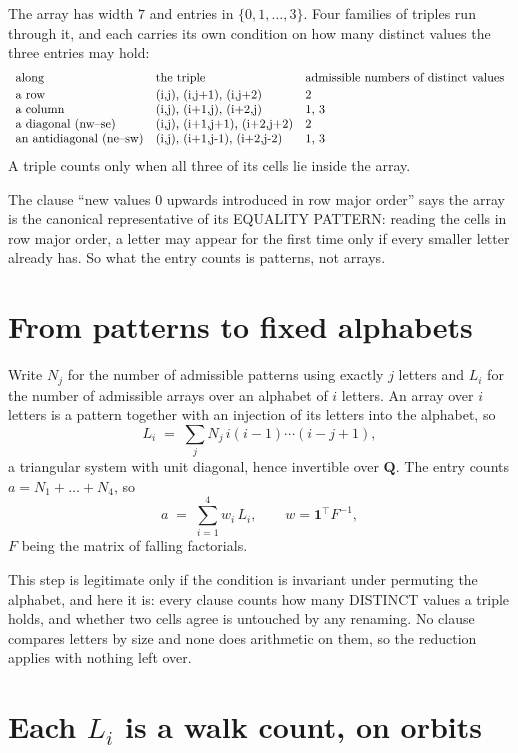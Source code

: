 \documentclass[11pt,a4paper]{article}
\theoremstyle{plain}
\theoremstyle{definition}
\begin{document}
The array has width $7$ and entries in $\{0,1,\dots,3\}$. Four families of triples
run through it, and each carries its own condition on how many distinct values the three
entries may hold:
\[
\begin{array}{lll}
\text{along} & \text{the triple} & \text{admissible numbers of distinct values} \\[2pt]
\text{a row} & $(i,j),\ (i,j+1),\ (i,j+2)$ & $2$ \\
\text{a column} & $(i,j),\ (i+1,j),\ (i+2,j)$ & $1, 3$ \\
\text{a diagonal (nw--se)} & $(i,j),\ (i+1,j+1),\ (i+2,j+2)$ & $2$ \\
\text{an antidiagonal (ne--sw)} & $(i,j),\ (i+1,j-1),\ (i+2,j-2)$ & $1, 3$ \\
\end{array}
\]
A triple counts only when all three of its cells lie inside the array.

The clause ``new values $0$ upwards introduced in row major order'' says the array is the
canonical representative of its EQUALITY PATTERN: reading the cells in row major order, a
letter may appear for the first time only if every smaller letter already has. So what the
entry counts is patterns, not arrays.

\section{From patterns to fixed alphabets}

Write $N_j$ for the number of admissible patterns using exactly $j$ letters and $L_i$ for the
number of admissible arrays over an alphabet of $i$ letters. An array over $i$ letters is a
pattern together with an injection of its letters into the alphabet, so
\[
L_i\;=\;\sum_j N_j\,i(i-1)\cdots(i-j+1),
\]
a triangular system with unit diagonal, hence invertible over $\mathbf{Q}$. The entry counts
$a=N_1+\dots+N_{4}$, so
\[
a\;=\;\sum_{i=1}^{4}w_i\,L_i ,\qquad w=\mathbf{1}^{\!\top}F^{-1},
\]
$F$ being the matrix of falling factorials.

This step is legitimate only if the condition is invariant under permuting the alphabet, and
here it is: every clause counts how many DISTINCT values a triple holds, and whether two cells
agree is untouched by any renaming. No clause compares letters by size and none does arithmetic
on them, so the reduction applies with nothing left over.

\section{Each $L_i$ is a walk count, on orbits}
\end{document}
